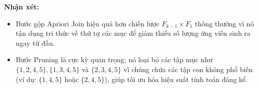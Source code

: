 \textbf{Nhận xét:}
\begin{itemize}
    \item Bước gộp Apriori Join hiệu quả hơn chiến lược $F_{k-1} \times F_1$ thông thường vì nó tận dụng tri thức về thứ tự các mục để giảm thiểu số lượng ứng viên sinh ra ngay từ đầu.
    \item Bước Pruning là cực kỳ quan trọng; nó loại bỏ các tập mục như $\{1,2,4,5\}, \{1,3,4,5\}$ và $\{2,3,4,5\}$ vì chúng chứa các tập con không phổ biến (ví dụ: $\{1,4,5\}$ hoặc $\{2,4,5\}$), giúp tối ưu hóa hiệu suất tính toán đáng kể.
\end{itemize}
